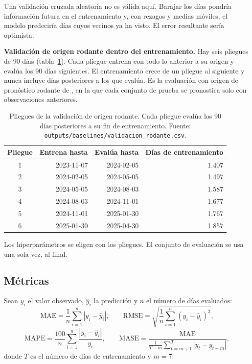 Una validación cruzada aleatoria no es válida aquí. Barajar los días pondría información futura en el entrenamiento y, con rezagos y medias móviles, el modelo predeciría días cuyos vecinos ya ha visto. El error resultante sería optimista.

\textbf{Validación de origen rodante dentro del entrenamiento.} Hay seis pliegues de 90 días (tabla~\ref{tab:pliegues}). Cada pliegue entrena con todo lo anterior a su origen y evalúa los 90 días siguientes. El entrenamiento crece de un pliegue al siguiente y nunca incluye días posteriores a los que evalúa. Es la evaluación con origen de pronóstico rodante de \citet{hyndman2021}, en la que cada conjunto de prueba se pronostica solo con observaciones anteriores.

\begin{table}[H]
\centering
\caption{Pliegues de la validación de origen rodante. Cada pliegue evalúa los 90 días posteriores a su fin de entrenamiento. Fuente: \texttt{outputs/\allowbreak{}baselines/\allowbreak{}validacion\_\allowbreak{}rodante.csv}.}\label{tab:pliegues}
\small
\begin{tabular}{@{}crrr@{}}
\toprule
\textbf{Pliegue} & \textbf{Entrena hasta} & \textbf{Evalúa hasta} & \textbf{Días de entrenamiento} \\
\midrule
1 & 2023-11-07 & 2024-02-05 & 1.407 \\
2 & 2024-02-05 & 2024-05-05 & 1.497 \\
3 & 2024-05-05 & 2024-08-03 & 1.587 \\
4 & 2024-08-03 & 2024-11-01 & 1.677 \\
5 & 2024-11-01 & 2025-01-30 & 1.767 \\
6 & 2025-01-30 & 2025-04-30 & 1.857 \\
\bottomrule
\end{tabular}
\end{table}

Los hiperparámetros se eligen con los pliegues. El conjunto de evaluación se usa una sola vez, al final.

\subsection{Métricas}\label{sec:metricas}

Sean $y_i$ el valor observado, $\hat{y}_i$ la predicción y $n$ el número de días evaluados:
\[
\mathrm{MAE} = \frac{1}{n}\sum_{i=1}^{n} |y_i - \hat{y}_i|, \qquad
\mathrm{RMSE} = \sqrt{\frac{1}{n}\sum_{i=1}^{n} (y_i - \hat{y}_i)^2},
\]
\[
\mathrm{MAPE} = \frac{100}{n}\sum_{i=1}^{n} \frac{|y_i - \hat{y}_i|}{y_i}, \qquad
\mathrm{MASE} = \frac{\mathrm{MAE}}{\frac{1}{T-m}\sum_{t=m+1}^{T} |y_t - y_{t-m}|},
\]
donde $T$ es el número de días de entrenamiento y $m = 7$.

